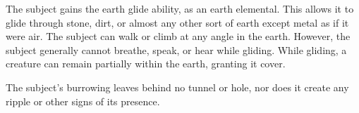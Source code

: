 \spelldur{\durshort}
\begin{spelleffect}
  The subject gains the earth glide ability, as an earth elemental. This allows it to glide through stone, dirt, or almost any other sort of earth except metal  as if it were air. The subject can walk or climb at any angle in the earth. However, the subject generally cannot breathe, speak, or hear while gliding. While gliding, a creature can remain partially within the earth, granting it cover.
\end{spelleffect}
\begin{spellnotes}
  The subject's burrowing leaves behind no tunnel or hole, nor does it create any ripple or other signs of its presence.
\end{spellnotes}

